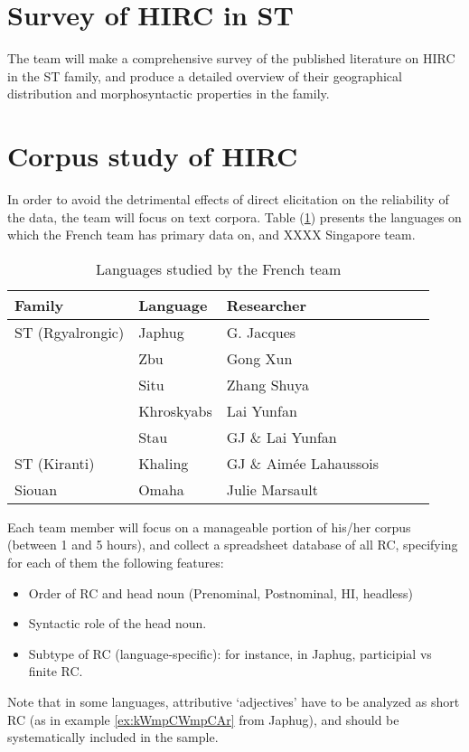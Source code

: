 \documentclass[oneside,a4paper,11pt]{article}
\begin{document}
\section{Survey of HIRC in ST}
The team will make a comprehensive survey of the published literature on HIRC in the ST family, and produce a detailed overview of their geographical distribution and morphosyntactic properties in the family.

\section{Corpus study of HIRC}
In order to avoid the detrimental effects of direct elicitation on the reliability of the data, the team will focus on text corpora. Table (\ref{tab:french}) presents the languages on which the French team has primary data on, and XXXX Singapore team.

\begin{table}[h]
\caption{Languages studied by the French team} \centering \label{tab:french}
\begin{tabular}{llllll}
\toprule
Family &Language & Researcher\\
\midrule
ST (Rgyalrongic) &Japhug & G. Jacques \\
& Zbu & Gong Xun \\
& Situ & Zhang Shuya \\
& Khroskyabs & Lai Yunfan \\
&Stau & GJ \& Lai Yunfan \\
ST (Kiranti) &Khaling & GJ \& Aimée Lahaussois \\
Siouan & Omaha & Julie Marsault \\
\bottomrule
\end{tabular}
\end{table}

Each team member will focus on a manageable portion of his/her corpus (between 1 and 5 hours), and collect a spreadsheet database of all RC, specifying for each of them the following features:

\begin{itemize}
\item Order of RC and head noun (Prenominal, Postnominal, HI, headless)
\item Syntactic role of the head noun.
\item Subtype of RC (language-specific): for instance, in Japhug, participial vs finite RC.
\end{itemize}

Note that in some languages, attributive `adjectives' have to be analyzed as short RC (as in example \ref{ex:kWmpCWmpCAr} from Japhug), and should be systematically included in the sample.
\end{document}
